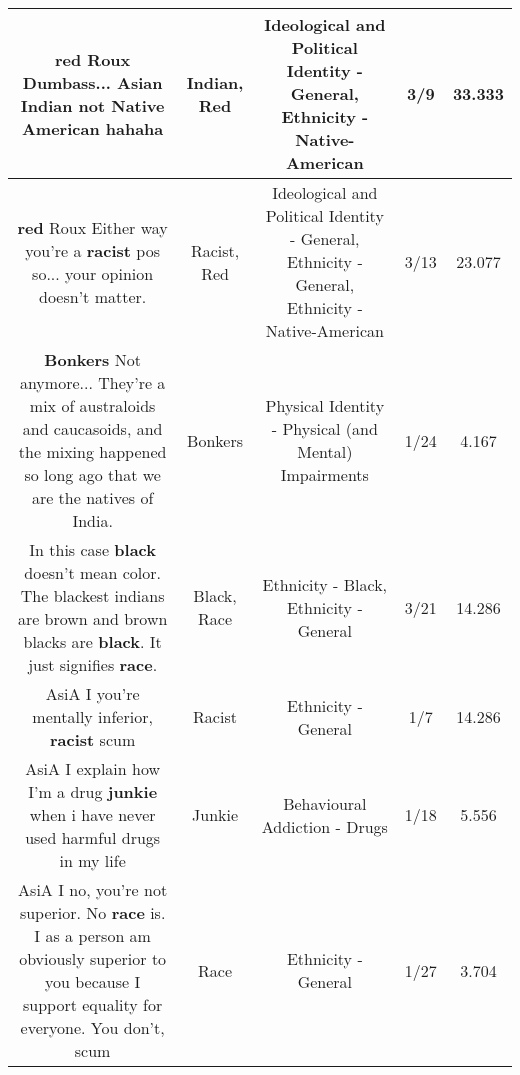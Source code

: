 \documentclass[11pt]{article}
\newlength\mylength
\begin{document}
\begin{center}
\begin{longtable}{|C{.65\mylength}|C{.30\mylength}|C{.12\mylength}|C{.12\mylength}|C{.12\mylength}|}
  \small \@\textbf{r\textbf{ed}} Roux Dumbass... Asian \textbf{Indian} not Native American hahaha\normalsize   & Indian, Red &  Ideological and Political Identity - General, Ethnicity - Native-American & 3/9 & 33.333 \\  \hline
  \small \@\textbf{r\textbf{ed}} Roux Either way you're a \textbf{racist} pos so... your opinion doesn't matter.\normalsize   & Racist, Red &  Ideological and Political Identity - General, Ethnicity - General, Ethnicity - Native-American & 3/13 & 23.077 \\  \hline
  \small \@\textbf{Bonkers} Not anymore... They're a mix of australoids and caucasoids, and the mixing happened so long ago that we are the natives of India.\normalsize   & Bonkers & Physical Identity - Physical (and Mental) Impairments & 1/24 & 4.167 \\  \hline
  \small In this case \textbf{black} doesn't mean color. The blackest indians are brown and brown blacks are \textbf{black}. It just signifies \textbf{race}.\normalsize   & Black, Race & Ethnicity - Black, Ethnicity - General & 3/21 & 14.286 \\  \hline
  \small AsiA I you're mentally inferior, \textbf{racist} scum\normalsize   & Racist & Ethnicity - General & 1/7 & 14.286 \\  \hline
  \small AsiA I explain how I'm a drug \textbf{junkie} when i have never used harmful drugs in my life\normalsize   & Junkie & Behavioural Addiction - Drugs & 1/18 & 5.556 \\  \hline
  \small AsiA I no, you're not superior. No \textbf{race} is. I as a person am obviously superior to you because I support equality for everyone. You don't, scum\normalsize   & Race & Ethnicity - General & 1/27 & 3.704 \\  \hline

\end{longtable}
\end{center}
\end{document}
